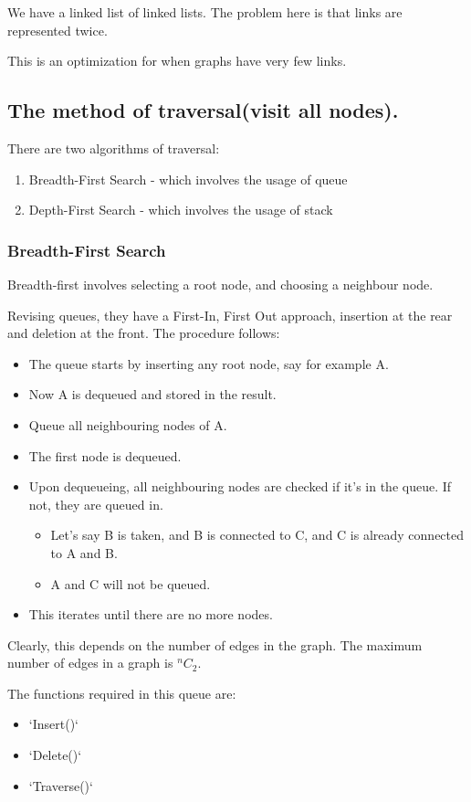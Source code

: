 \documentclass[11pt]{article}
\begin{document}
We have a linked list of linked lists. The problem here is that links are represented twice.

This is an optimization for when graphs have very few links.
\subsection{The method of traversal(visit all nodes).}
\label{sec:org0dfe080}

There are two algorithms of traversal:
\begin{enumerate}
\item Breadth-First Search - which involves the usage of queue
\item Depth-First Search - which involves the usage of stack
\end{enumerate}
\subsubsection{Breadth-First Search}
\label{sec:org6615423}
Breadth-first involves selecting a root node, and choosing a neighbour node.

Revising queues, they have a First-In, First Out approach, insertion at the rear and deletion at the front.
The procedure follows:
\begin{itemize}
\item The queue starts by inserting any root node, say for example A.
\item Now A is dequeued and stored in the result.
\item Queue all neighbouring nodes of A.
\item The first node is dequeued.
\item Upon dequeueing, all neighbouring nodes are checked if it's in the queue. If not, they are queued in.
\begin{itemize}
\item Let's say B is taken, and B is connected to C, and C is already connected to A and B.
\item A and C will not be queued.
\end{itemize}
\item This iterates until there are no more nodes.
\end{itemize}

Clearly, this depends on the number of edges in the graph. The maximum number of edges in a graph is \(^nC_2\).

The functions required in this queue are:
\begin{itemize}
\item `Insert()`
\item `Delete()`
\item `Traverse()`
\end{itemize}
\end{document}
